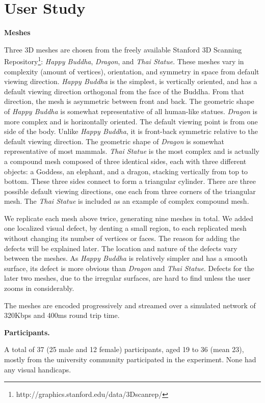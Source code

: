 \section{User Study}
\label{s:user:study}
\textbf{Meshes}

Three 3D meshes are chosen from the freely available
Stanford 3D Scanning Repository\footnote{http://graphics.stanford.edu/data/3Dscanrep/}:
\textit{Happy Buddha}, \textit{Dragon}, and \textit{Thai Statue}.
These meshes vary in complexity (amount of vertices), orientation, and
symmetry in space from default viewing direction. \textit{Happy Buddha} is the
simplest, is vertically oriented, and has a default viewing direction
orthogonal from the face of the Buddha. From that direction, the mesh is
asymmetric between front and back. The geometric shape of \textit{Happy Buddha} is
somewhat representative of all human-like statues. \textit{Dragon} is more complex
and is horizontally oriented. The default viewing point is from one
side of the body. Unlike \textit{Happy Buddha}, it is front-back symmetric
relative to the default viewing direction. The geometric shape of \textit{Dragon} is
somewhat representative of most mammals. \textit{Thai Statue} is the most complex
and is actually a compound mesh composed of three identical sides, each 
with three different objects: a Goddess, an elephant, and a dragon,
stacking vertically from top to bottom.  These three sides connect to
form a triangular cylinder. There are three possible default
viewing directions, one each from three corners of the triangular mesh. The
\textit{Thai Statue} is included as an example of complex compound mesh.

We replicate each mesh above twice, generating nine meshes in total.  
We added one localized visual defect, by denting a small region, to each replicated mesh 
without changing its number of vertices or faces. The reason for adding the defects will be explained later. 
The location and nature of the
defects vary between the meshes. As \textit{Happy Buddha} is
relatively simpler and has a smooth surface, its defect is
 more obvious than \textit{Dragon}
and \textit{Thai Statue}.  Defects for the later two meshes, due to the
irregular surfaces, are hard to find unless the user zooms in
considerably.

The meshes are encoded progressively and streamed over a simulated network of 320Kbps and 400ms round trip time.  

\textbf{Participants.}

A total of 37 (25 male and 12 female) participants, aged 19 to 36
(mean 23), mostly from the university community participated in the
experiment. None had any visual handicaps.

